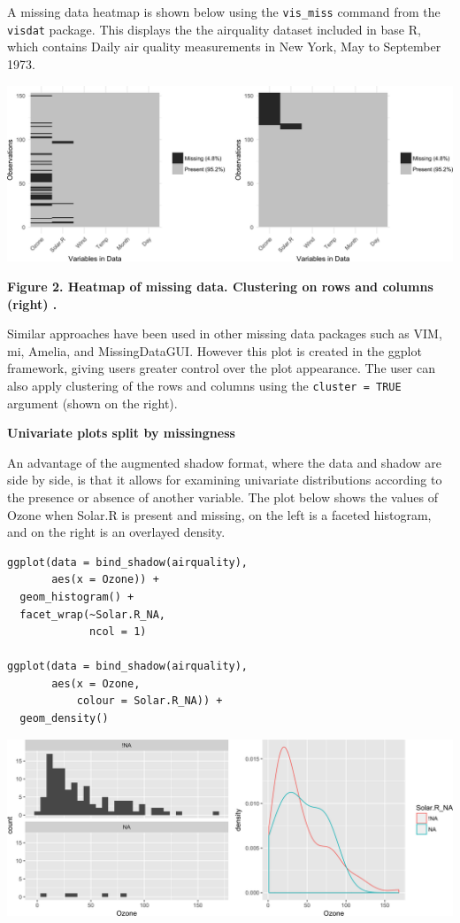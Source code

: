 \documentclass[]{article}
\begin{document}
A missing data heatmap is shown below using the \texttt{vis\_miss}
command from the \texttt{visdat} package. This displays the the
airquality dataset included in base R, which contains Daily air quality
measurements in New York, May to September 1973.

\includegraphics{blinded_jsm2017_missing_data_vis_files/figure-latex/unnamed-chunk-1-1.png}

\textbf{Figure 2. Heatmap of missing data. Clustering on rows and
columns (right) .}

Similar approaches have been used in other missing data packages such as
VIM, mi, Amelia, and MissingDataGUI. However this plot is created in the
ggplot framework, giving users greater control over the plot appearance.
The user can also apply clustering of the rows and columns using the
\texttt{cluster\ =\ TRUE} argument (shown on the right).

\textbf{Univariate plots split by missingness}

An advantage of the augmented shadow format, where the data and shadow
are side by side, is that it allows for examining univariate
distributions according to the presence or absence of another variable.
The plot below shows the values of Ozone when Solar.R is present and
missing, on the left is a faceted histogram, and on the right is an
overlayed density.

\begin{verbatim}
ggplot(data = bind_shadow(airquality),
       aes(x = Ozone)) + 
  geom_histogram() + 
  facet_wrap(~Solar.R_NA,
             ncol = 1)

ggplot(data = bind_shadow(airquality),
       aes(x = Ozone,
           colour = Solar.R_NA)) + 
  geom_density()
\end{verbatim}

\includegraphics{blinded_jsm2017_missing_data_vis_files/figure-latex/bind-shadow-density-1.png}
\end{document}
